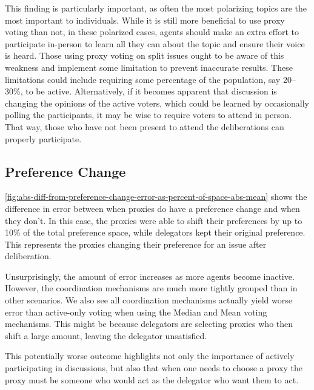 This finding is particularly important, as often the most polarizing topics are the
most important to individuals.
While it is still more beneficial to use proxy voting than not, in these polarized
cases, agents should make an extra effort to participate in-person to learn all they
can about the topic and ensure their voice is heard.
Those using proxy voting on split issues ought to be aware of this weakness and
implement some limitation to prevent inaccurate results.
These limitations could include requiring some percentage of the population, say
20--30\%, to be active.
Alternatively, if it becomes apparent that discussion is changing the opinions of the
active voters, which could be learned by occasionally polling the participants, it
may be wise to require voters to attend in person.
That way, those who have not been present to attend the deliberations can properly
participate.

\subsection{Preference Change}\label{subsec:results-shift}
\autoref{fig:abs-diff-from-preference-change-error-as-percent-of-space-abs-mean} shows
the difference in error between when proxies do have a preference change and when
they don't.
In this case, the proxies were able to shift their preferences by up to 10\% of the
total preference space, while delegators kept their original preference.
This represents the proxies changing their preference for an issue after deliberation.

Unsurprisingly, the amount of error increases as more agents become inactive.
However, the coordination mechanisms are much more tightly grouped than in other
scenarios.
We also see all coordination mechanisms actually yield worse error than active-only
voting when using the Median and Mean voting mechanisms.
This might be because delegators are selecting proxies who then shift a large amount,
leaving the delegator unsatisfied.

This potentially worse outcome highlights not only the importance of actively
participating in discussions, but also that when one needs to choose a proxy the
proxy must be someone who would act as the delegator who want them to act.

